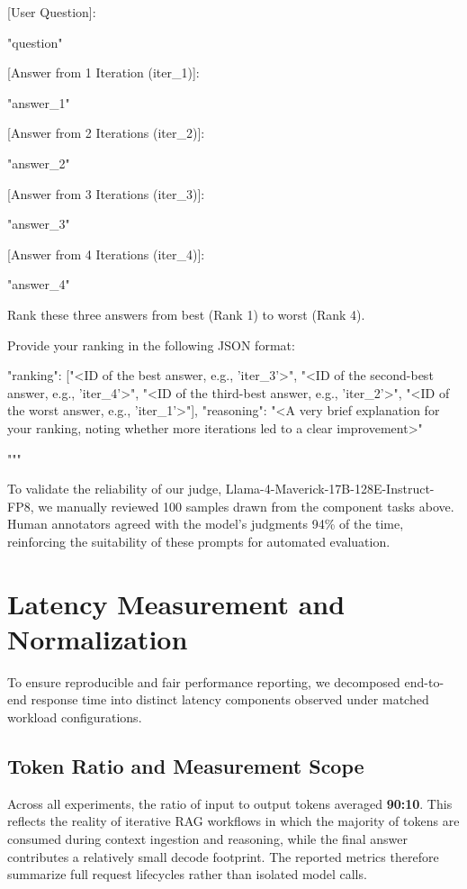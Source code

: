 \documentclass[11pt]{article}
\begin{document}
\begin{PromptBlock}
{  [User Question]:

  "{question}"

  [Answer from 1 Iteration (iter_1)]:

  "{answer_1}"

  [Answer from 2 Iterations (iter_2)]:

  "{answer_2}"

  [Answer from 3 Iterations (iter_3)]:

  "{answer_3}"

  [Answer from 4 Iterations (iter_4)]:

  "{answer_4}"

  Rank these three answers from best (Rank 1) to worst (Rank 4).

  Provide your ranking in the following JSON format:

  {{
    "ranking": ["<ID of the best answer, e.g., 'iter_3'>", "<ID of the second-best answer, e.g., 'iter_4'>", "<ID of the third-best answer, e.g., 'iter_2'>", "<ID of the worst answer, e.g., 'iter_1'>"],
    "reasoning": "<A very brief explanation for your ranking, noting whether more iterations led to a clear improvement>"
  }}

  """

}
\end{PromptBlock}

To validate the reliability of our judge, Llama-4-Maverick-17B-128E-Instruct-FP8, we manually reviewed 100 samples drawn from the component tasks above. Human annotators agreed with the model's judgments 94\% of the time, reinforcing the suitability of these prompts for automated evaluation.

\section{Latency Measurement and Normalization}
\label{sec:appendix-metrics}

To ensure reproducible and fair performance reporting, we decomposed end-to-end response time into distinct latency components observed under matched workload configurations.

\subsection{Token Ratio and Measurement Scope}

Across all experiments, the ratio of input to output tokens averaged \textbf{90:10}. This reflects the reality of iterative RAG workflows in which the majority of tokens are consumed during context ingestion and reasoning, while the final answer contributes a relatively small decode footprint. The reported metrics therefore summarize full request lifecycles rather than isolated model calls.
\end{document}
